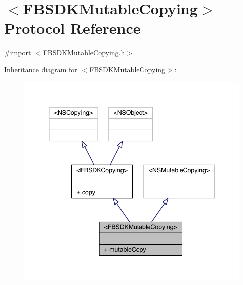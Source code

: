 \hypertarget{protocol_f_b_s_d_k_mutable_copying-p}{\section{$<$F\-B\-S\-D\-K\-Mutable\-Copying$>$ Protocol Reference}
\label{protocol_f_b_s_d_k_mutable_copying-p}
}


{\ttfamily \#import $<$F\-B\-S\-D\-K\-Mutable\-Copying.\-h$>$}



Inheritance diagram for $<$F\-B\-S\-D\-K\-Mutable\-Copying$>$\-:
\nopagebreak
\begin{figure}[H]
\begin{center}
\leavevmode
\includegraphics[width=345pt]{protocol_f_b_s_d_k_mutable_copying-p__inherit__graph}
\end{center}
\end{figure}


